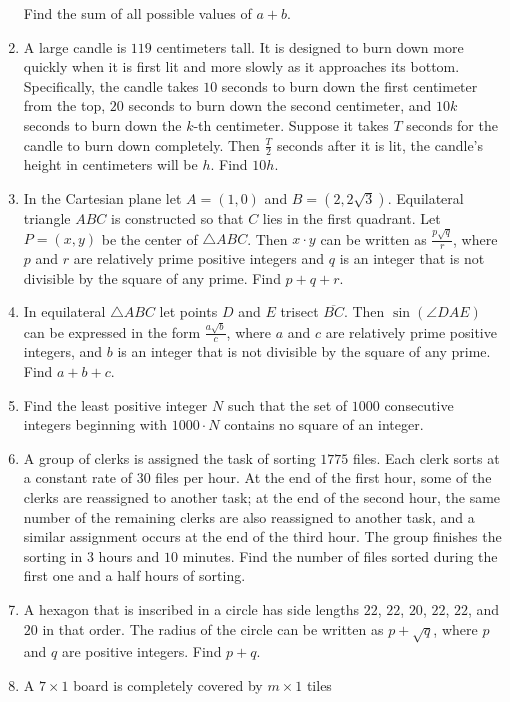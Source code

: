 \documentclass{article}
\begin{document}
\begin{enumerate}[label=\arabic*., itemsep=0.5em]
Find the sum of all possible values of $a+b$.\par \vspace{0.5em}\item A large candle is $119$ centimeters tall.  It is designed to burn down more quickly when it is first lit and more slowly as it approaches its bottom.  Specifically, the candle takes $10$ seconds to burn down the first centimeter from the top, $20$ seconds to burn down the second centimeter, and $10k$ seconds to burn down the $k$-th centimeter.  Suppose it takes $T$ seconds for the candle to burn down completely.  Then $\tfrac{T}{2}$ seconds after it is lit, the candle's height in centimeters will be $h$.  Find $10h$.\par \vspace{0.5em}\item In the Cartesian plane let $A = (1,0)$ and $B = \left( 2, 2\sqrt{3} \right)$.  Equilateral triangle $ABC$ is constructed so that $C$ lies in the first quadrant.  Let $P=(x,y)$ be the center of $\triangle ABC$.  Then $x \cdot y$ can be written as $\tfrac{p\sqrt{q}}{r}$, where $p$ and $r$ are relatively prime positive integers and $q$ is an integer that is not divisible by the square of any prime.  Find $p+q+r$.\par \vspace{0.5em}\item In equilateral $\triangle ABC$ let points $D$ and $E$ trisect $\overline{BC}$. Then $\sin(\angle DAE)$ can be expressed in the form $\frac{a\sqrt{b}}{c}$, where $a$ and $c$ are relatively prime positive integers, and $b$ is an integer that is not divisible by the square of any prime. Find $a+b+c$.\par \vspace{0.5em}\item Find the least positive integer $N$ such that the set of $1000$ consecutive integers beginning with $1000\cdot N$ contains no square of an integer.\par \vspace{0.5em}\item A group of clerks is assigned the task of sorting $1775$ files. Each clerk sorts at a constant rate of $30$ files per hour. At the end of the first hour, some of the clerks are reassigned to another task; at the end of the second hour, the same number of the remaining clerks are also reassigned to another task, and a similar assignment occurs at the end of the third hour. The group finishes the sorting in $3$ hours and $10$ minutes. Find the number of files sorted during the first one and a half hours of sorting.\par \vspace{0.5em}\item A hexagon that is inscribed in a circle has side lengths $22$, $22$, $20$, $22$, $22$, and $20$ in that order. The radius of the circle can be written as $p+\sqrt{q}$, where $p$ and $q$ are positive integers. Find $p+q$.\par \vspace{0.5em}\item A $7\times 1$ board is completely covered by $m\times 1$ tiles 
\end{enumerate}
\end{document}

